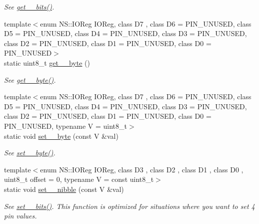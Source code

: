 \begin{DoxyCompactItemize}
\begin{DoxyCompactList}\small\item\em See \hyperlink{namespaceports_a9a1959ec95780c00a964b174a27b2a37}{get\+\_\+\_\+bits()}. \end{DoxyCompactList}\item 
{\footnotesize template$<$enum N\+S\+::\+I\+O\+Reg I\+O\+Reg, class D7 , class D6  = P\+I\+N\+\_\+\+U\+N\+U\+S\+ED, class D5  = P\+I\+N\+\_\+\+U\+N\+U\+S\+ED, class D4  = P\+I\+N\+\_\+\+U\+N\+U\+S\+ED, class D3  = P\+I\+N\+\_\+\+U\+N\+U\+S\+ED, class D2  = P\+I\+N\+\_\+\+U\+N\+U\+S\+ED, class D1  = P\+I\+N\+\_\+\+U\+N\+U\+S\+ED, class D0  = P\+I\+N\+\_\+\+U\+N\+U\+S\+ED$>$ }\\static uint8\+\_\+t \hyperlink{namespaceports_abcf67102d107c0aaad21fbb9f15563ae}{get\+\_\+\_\+byte} ()
\begin{DoxyCompactList}\small\item\em See \hyperlink{namespaceports_ae7d1ffc9ed6454ca61b006ffe43e4e6e}{get\+\_\+\_\+byte()}. \end{DoxyCompactList}\item 
{\footnotesize template$<$enum N\+S\+::\+I\+O\+Reg I\+O\+Reg, class D7 , class D6  = P\+I\+N\+\_\+\+U\+N\+U\+S\+ED, class D5  = P\+I\+N\+\_\+\+U\+N\+U\+S\+ED, class D4  = P\+I\+N\+\_\+\+U\+N\+U\+S\+ED, class D3  = P\+I\+N\+\_\+\+U\+N\+U\+S\+ED, class D2  = P\+I\+N\+\_\+\+U\+N\+U\+S\+ED, class D1  = P\+I\+N\+\_\+\+U\+N\+U\+S\+ED, class D0  = P\+I\+N\+\_\+\+U\+N\+U\+S\+ED, typename V  = uint8\+\_\+t$>$ }\\static void \hyperlink{namespaceports_a61265646961334c58df6d4ed66e290d0}{set\+\_\+\_\+byte} (const V \&val)
\begin{DoxyCompactList}\small\item\em See \hyperlink{namespaceports_a7034c689dd509dc9c11ba8be46a26fd0}{set\+\_\+\_\+byte()}. \end{DoxyCompactList}\item 
{\footnotesize template$<$enum N\+S\+::\+I\+O\+Reg I\+O\+Reg, class D3 , class D2 , class D1 , class D0 , uint8\+\_\+t offset = 0, typename V  = const uint8\+\_\+t$>$ }\\static void \hyperlink{namespaceports_af6d35bb70c3973212025200a2af3ac5c}{set\+\_\+\_\+nibble} (const V \&val)
\begin{DoxyCompactList}\small\item\em See \hyperlink{namespaceports_aac15fb87d8fede3f2bf8d764ab42965f}{set\+\_\+\_\+bits()}. This function is optimized for situations where you want to set 4 pin values. \end{DoxyCompactList}\end{DoxyCompactItemize}


